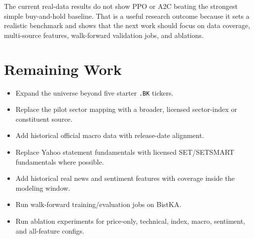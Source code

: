 \documentclass[11pt]{article}
\begin{document}
The current real-data results do not show PPO or A2C beating the strongest simple buy-and-hold baseline. That is a useful research outcome because it sets a realistic benchmark and shows that the next work should focus on data coverage, multi-source features, walk-forward validation jobs, and ablations.

\section{Remaining Work}
\begin{itemize}
\item Expand the universe beyond five starter \texttt{.BK} tickers.
\item Replace the pilot sector mapping with a broader, licensed sector-index or constituent source.
\item Add historical official macro data with release-date alignment.
\item Replace Yahoo statement fundamentals with licensed SET/SETSMART fundamentals where possible.
\item Add historical real news and sentiment features with coverage inside the modeling window.
\item Run walk-forward training/evaluation jobs on BistKA.
\item Run ablation experiments for price-only, technical, index, macro, sentiment, and all-feature configs.
\end{itemize}
\end{document}
